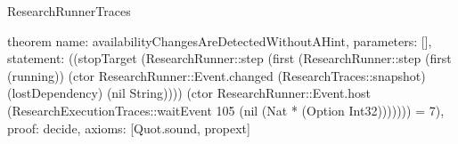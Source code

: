 \begin{lexlean}{ResearchRunnerTraces}
\begin{semanticmodule}
theorem{
  name: availabilityChangesAreDetectedWithoutAHint,
  parameters: [],
  statement: ((stopTarget (ResearchRunner::step (first (ResearchRunner::step (first (running)) (ctor ResearchRunner::Event.changed (ResearchTraces::snapshot) (lostDependency) (nil String)))) (ctor ResearchRunner::Event.host (ResearchExecutionTraces::waitEvent 105 (nil (Nat * (Option Int32))))))) = 7),
  proof: decide{},
  axioms: [Quot.sound, propext]
}

\end{semanticmodule}
\end{lexlean}
